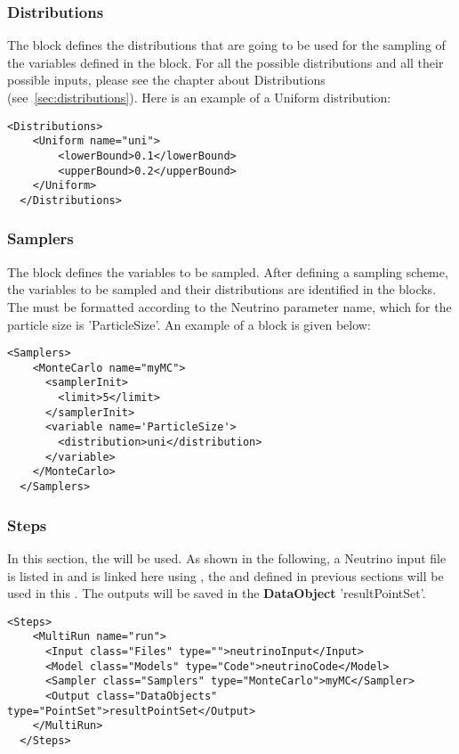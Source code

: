 \subsubsection{Distributions}
The  block defines the distributions that are going to be used for the sampling
of the variables defined in the  block. For all the possible distributions and all
their possible inputs, please see the chapter about Distributions (see~\ref{sec:distributions}). Here is an example of a
Uniform distribution:
\begin{lstlisting}[style=XML]
  <Distributions>
    <Uniform name="uni">
        <lowerBound>0.1</lowerBound>
        <upperBound>0.2</upperBound>
    </Uniform>
  </Distributions>
\end{lstlisting}
%
\subsubsection{Samplers}
The  block defines the variables to be sampled. After defining a sampling scheme, the variables to be sampled and
their distributions are identified in the  blocks.
The  must be formatted according to the Neutrino parameter name, which for the particle size is
'ParticleSize'.
An example of a  block is given below:
\begin{lstlisting}[style=XML]
 <Samplers>
    <MonteCarlo name="myMC">
      <samplerInit>
        <limit>5</limit>
      </samplerInit>
      <variable name='ParticleSize'>
        <distribution>uni</distribution>
      </variable>
    </MonteCarlo>
  </Samplers>
\end{lstlisting}

\subsubsection{Steps}
In this section, the  will be used. As shown in the following, a Neutrino
input file is listed in  and is linked here using , the 
and  defined in previous sections will be used in this . The
outputs will be saved in the \textbf{DataObject} 'resultPointSet'.

\begin{lstlisting}[style=XML]
  <Steps>
    <MultiRun name="run">
      <Input class="Files" type="">neutrinoInput</Input>
      <Model class="Models" type="Code">neutrinoCode</Model>
      <Sampler class="Samplers" type="MonteCarlo">myMC</Sampler>
      <Output class="DataObjects" type="PointSet">resultPointSet</Output>
    </MultiRun>
  </Steps>
\end{lstlisting}

